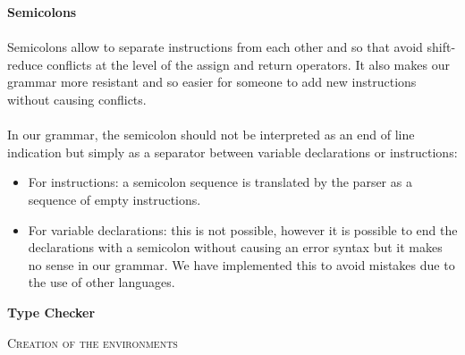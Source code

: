 \documentclass[11pt]{report}
\begin{document}
{} 
\tabto{2cm} \textbf{Semicolons} \\ \\
\tabto{1cm}Semicolons allow to separate instructions from each other and so that avoid shift-reduce conflicts at the level of the assign and return operators. It also makes our grammar more resistant and so easier for someone to add new instructions without causing conflicts. \\ \\
\tabto{1cm} In our grammar, the semicolon should not be interpreted as an end of line indication but simply as a separator between variable declarations or instructions:
\begin{itemize}
\item For instructions: a semicolon sequence is translated by the parser as a sequence of empty instructions.
\item For variable declarations: this is not possible, however it is possible to end the declarations with a semicolon without causing an error syntax but it makes no sense in our grammar. We have implemented this to avoid mistakes due to the use of other languages.
\end{itemize}

\newpage

{}
\centerline{\textbf{\Huge Type Checker}}
\vspace*{15pt}

{}

\vspace*{10pt}
\vspace*{3pt}
{}
\tabto{1cm} {\Large \textsc{Creation of the environments}}
\end{document}
